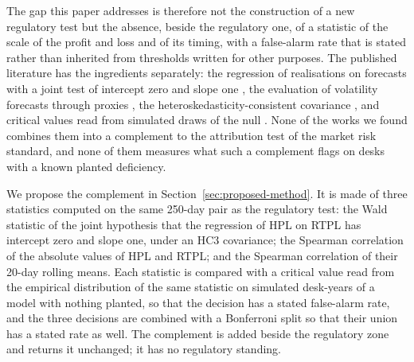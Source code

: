 The gap this paper addresses is therefore not the construction of a new regulatory test but the absence, beside the regulatory one, of a statistic of the scale of the profit and loss and of its timing, with a false-alarm rate that is stated rather than inherited from thresholds written for other purposes.
The published literature has the ingredients separately: the regression of realisations on forecasts with a joint test of intercept zero and slope one \citep{mincer1969}, the evaluation of volatility forecasts through proxies \citep{patton2011,patton2009}, the heteroskedasticity-consistent covariance \citep{white1980,mackinnon1985}, and critical values read from simulated draws of the null \citep{dufour2006}.
None of the works we found combines them into a complement to the attribution test of the market risk standard, and none of them measures what such a complement flags on desks with a known planted deficiency.

We propose the complement in Section~\ref{sec:proposed-method}.
It is made of three statistics computed on the same 250-day pair as the regulatory test: the Wald statistic of the joint hypothesis that the regression of HPL on RTPL has intercept zero and slope one, under an HC3 covariance; the Spearman correlation of the absolute values of HPL and RTPL; and the Spearman correlation of their 20-day rolling means.
Each statistic is compared with a critical value read from the empirical distribution of the same statistic on simulated desk-years of a model with nothing planted, so that the decision has a stated false-alarm rate, and the three decisions are combined with a Bonferroni split so that their union has a stated rate as well.
The complement is added beside the regulatory zone and returns it unchanged; it has no regulatory standing.


